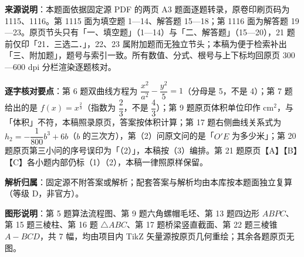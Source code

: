 

\begin{gknotice}
\textbf{来源说明}：本题面依据固定源 PDF 的两页 A3 题面逐题转录，原卷印刷页码为 1115、1116。第 1115 面为填空题 1—14、解答题 15—18；第 1116 面为解答题 19—23。原页节头只有「一、填空题」（1—14）与「二、解答题」（15—20），21 题前仅印「21．三选二．」，22、23 属附加题而无独立节头；本稿为便于检索补出「三、附加题」，题号与索引一致。所有数值、分式、根号与上下标均回原页 300—600 dpi 分栏渲染逐题核对。

\textbf{逐字核对要点}：第 6 题双曲线方程为 $\dfrac{x^2}{a^2}-\dfrac{y^2}{5}=1$（分母是 5，不是 4）；第 7 题给出的是 $f(x)=x^{\frac23}$（指数为 $\dfrac23$，不是 $\dfrac43$）；第 9 题原页体积单位印作 $\mathrm{cm}^2$，与「体积」不符，本稿照录原页，答案按体积计算；第 17 题右侧曲线关系式为 $h_2=-\dfrac1{800}b^3+6b$（$b$ 的三次方），第（2）问原文问的是「$O'E$ 为多少米」；第 20 题原页第三小问的序号误印为「（2）」，本稿按（3）编排。第 21 题原页【A】【B】【C】各小题内部仍标（1）（2），本稿一律照原样保留。

\textbf{解析归属}：固定源不附答案或解析；配套答案与解析均由本库按本题面独立复算（等级 D，非官方）。

\textbf{图形说明}：第 5 题算法流程图、第 9 题六角螺帽毛坯、第 13 题四边形 $ABPC$、第 15 题三棱柱、第 16 题 $\triangle ABC$、第 17 题桥梁竖直截面、第 22 题三棱锥 $A-BCD$，共 7 幅，均由项目内 TikZ 矢量源按原页几何重绘；其余各题原页无图。
\end{gknotice}



